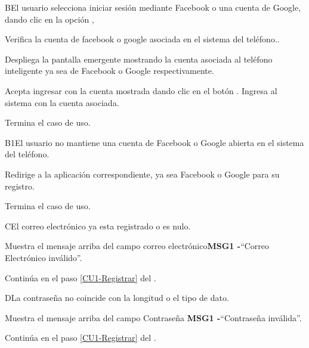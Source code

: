 		\begin{UCtrayectoriaA}{B}{El usuario selecciona iniciar sesión mediante Facebook o una cuenta de Google, dando clic en la opción , }
			
			\UCpaso Verifica la cuenta de facebook o google asociada en el sistema del teléfono..
				
			\UCpaso Despliega la pantalla emergente  mostrando la cuenta asociada al teléfono inteligente ya sea de Facebook o Google respectivamente.
			
			\UCpaso[\UCactor] Acepta ingresar con la cuenta mostrada dando clic en el botón  .
			\UCpaso Ingresa al sistema con la cuenta asociada.
		
			\UCpaso[] Termina el caso de uso.
			
		\end{UCtrayectoriaA}
	
		\begin{UCtrayectoriaA}{B1}{El usuario no mantiene una cuenta de Facebook o Google abierta en el sistema del teléfono.}
		
		\UCpaso Redirige a la aplicación correspondiente, ya sea Facebook o Google para su registro.
		
		\UCpaso[] Termina el caso de uso.
		
	\end{UCtrayectoriaA}

		\begin{UCtrayectoriaA}{C}{El correo electrónico ya esta registrado o es nulo.}
			
			\UCpaso Muestra el mensaje arriba del campo correo electrónico{\bf MSG1 -}``Correo Electrónico inválido''.
			
			\UCpaso Continúa en el paso \ref{CU1-Registrar} del .
			
		\end{UCtrayectoriaA}

		\begin{UCtrayectoriaA}{D}{La contraseña no coincide con la longitud o el tipo de dato.}
			
			\UCpaso Muestra el mensaje arriba del campo Contraseña {\bf MSG1 -}``Contraseña inválida''.
				
			\UCpaso Continúa en el paso \ref{CU1-Registrar} del .
		
	\end{UCtrayectoriaA}

